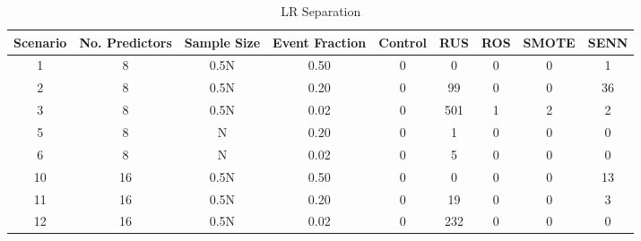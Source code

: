 \documentclass[
]{article}
\begin{document}
\begin{table}[!h]

\caption{\label{tab:invalid_ps}LR Separation}
\centering
\begin{tabular}[t]{ccccccccc}
\toprule
Scenario & No. Predictors & Sample Size & Event Fraction & Control & RUS & ROS & SMOTE & SENN\\
\midrule
1 & 8 & 0.5N & 0.50 & 0 & 0 & 0 & 0 & 1\\
 
2 & 8 & 0.5N & 0.20 & 0 & 99 & 0 & 0 & 36\\
 
3 & 8 & 0.5N & 0.02 & 0 & 501 & 1 & 2 & 2\\
 
5 & 8 & N & 0.20 & 0 & 1 & 0 & 0 & 0\\
 
6 & 8 & N & 0.02 & 0 & 5 & 0 & 0 & 0\\
 
10 & 16 & 0.5N & 0.50 & 0 & 0 & 0 & 0 & 13\\
 
11 & 16 & 0.5N & 0.20 & 0 & 19 & 0 & 0 & 3\\
 
12 & 16 & 0.5N & 0.02 & 0 & 232 & 0 & 0 & 0\\
\bottomrule
\end{tabular}
\end{table}
\end{document}
